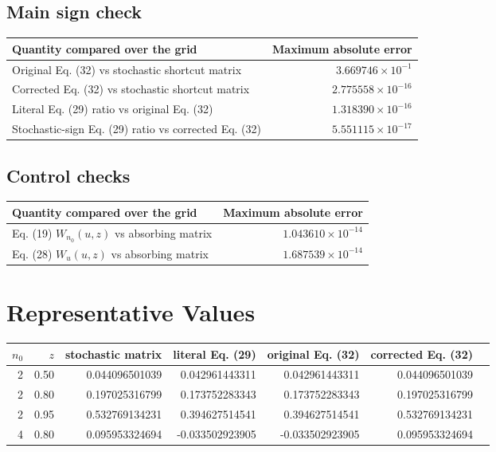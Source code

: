 \documentclass[11pt]{article}
\begin{document}
\subsection*{Main sign check}

\begin{center}
\begin{tabularx}{0.98\linewidth}{@{}Xr@{}}
\toprule
Quantity compared over the grid & Maximum absolute error \\
\midrule
Original Eq. (32) vs stochastic shortcut matrix & \(3.669746\times10^{-1}\) \\
Corrected Eq. (32) vs stochastic shortcut matrix & \(2.775558\times10^{-16}\) \\
Literal Eq. (29) ratio vs original Eq. (32) & \(1.318390\times10^{-16}\) \\
Stochastic-sign Eq. (29) ratio vs corrected Eq. (32) & \(5.551115\times10^{-17}\) \\
\bottomrule
\end{tabularx}
\end{center}

\subsection*{Control checks}

\begin{center}
\begin{tabularx}{0.98\linewidth}{@{}Xr@{}}
\toprule
Quantity compared over the grid & Maximum absolute error \\
\midrule
Eq. (19) \(W_{n_0}(u,z)\) vs absorbing matrix & \(1.043610\times10^{-14}\) \\
Eq. (28) \(W_u(u,z)\) vs absorbing matrix & \(1.687539\times10^{-14}\) \\
\bottomrule
\end{tabularx}
\end{center}

\section*{Representative Values}

\begin{center}
\small
\begin{tabular}{@{}rrrrrrr@{}}
\toprule
\(n_0\) & \(z\) & stochastic matrix & literal Eq. (29) & original Eq. (32) & corrected Eq. (32) \\
\midrule
2 & 0.50 & 0.044096501039 & 0.042961443311 & 0.042961443311 & 0.044096501039 \\
2 & 0.80 & 0.197025316799 & 0.173752283343 & 0.173752283343 & 0.197025316799 \\
2 & 0.95 & 0.532769134231 & 0.394627514541 & 0.394627514541 & 0.532769134231 \\
4 & 0.80 & 0.095953324694 & -0.033502923905 & -0.033502923905 & 0.095953324694 \\
\bottomrule
\end{tabular}
\end{center}
\end{document}

